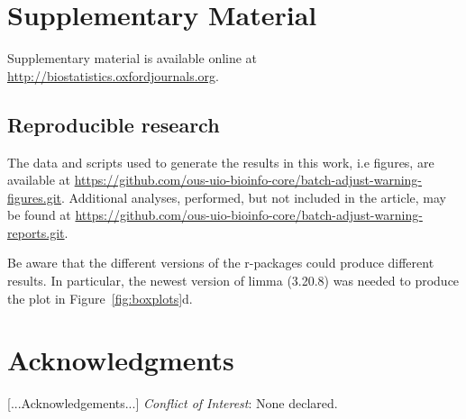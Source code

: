 \documentclass{bio}
\begin{document}
\section{Supplementary Material}
\label{supp}

Supplementary material is available online at
\href{http://biostatistics.oxfordjournals.org}%
{http://biostatistics.oxfordjournals.org}.


\subsection{Reproducible research}

The data and scripts used to generate the results in this work, i.e figures, are available at
\href{https://github.com/ous-uio-bioinfo-core/batch-adjust-warning-figures.git}{https://github.com/ous-uio-bioinfo-core/batch-adjust-warning-figures.git}.
Additional analyses, performed, but not included in the article, may be found at
\href{https://github.com/ous-uio-bioinfo-core/batch-adjust-warning-reports.git}{https://github.com/ous-uio-bioinfo-core/batch-adjust-warning-reports.git}.

Be aware that the different versions of the r-packages could produce different results. In particular, the newest version of limma (3.20.8) was needed to produce the plot in Figure~\ref{fig:boxplots}d.


\section*{Acknowledgments}

[...Acknowledgements...]
{\it Conflict of Interest}: None declared.



%


\end{document}
